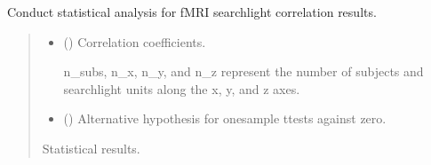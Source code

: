 \documentclass[letterpaper,10pt,english]{sphinxhowto}
\begin{document}
\begin{fulllineitems}
\label{\detokenize{stats_cal:neurora.stats_cal.stats_fmri}}
\pysigstartsignatures
{}
\pysigstopsignatures
\sphinxAtStartPar
Conduct statistical analysis for fMRI searchlight correlation results.
\begin{quote}\begin{description}
\begin{itemize}
\item {} 
\sphinxAtStartPar
{} (\sphinxstyleliteralemphasis{\sphinxupquote{, }}\sphinxstyleliteralemphasis{\sphinxupquote{ {[}}}\sphinxstyleliteralemphasis{\sphinxupquote{, }}\sphinxstyleliteralemphasis{\sphinxupquote{, }}\sphinxstyleliteralemphasis{\sphinxupquote{, }}\sphinxstyleliteralemphasis{\sphinxupquote{{]}}}) \textendash{} 
\sphinxAtStartPar
Correlation coefficients.

\sphinxAtStartPar
n\_subs, n\_x, n\_y, and n\_z represent the number of subjects and
searchlight units along the x, y, and z axes.


\item {} 
\sphinxAtStartPar
{} (\sphinxstyleliteralemphasis{\sphinxupquote{, }}\sphinxstyleliteralemphasis{\sphinxupquote{, }}\sphinxstyleliteralemphasis{\sphinxupquote{, }}) \textendash{} Alternative hypothesis for one\sphinxhyphen{}sample t\sphinxhyphen{}tests against zero.

\end{itemize}

\sphinxAtStartPar

\sphinxAtStartPar
{} \textendash{} Statistical results.


\end{description}
\end{quote}
\end{fulllineitems}
\end{document}

